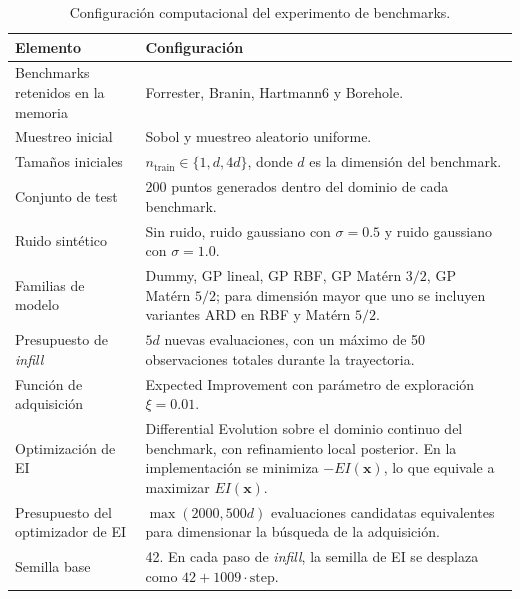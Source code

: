 \begin{table}[htbp]
\centering
\small
\caption[Configuración computacional de benchmarks]{Configuración computacional del experimento de benchmarks.}
\label{tab:app_benchmark_runtime_config}
\renewcommand{\arraystretch}{1.15}
\begin{tabularx}{\textwidth}{@{}p{4.3cm}X@{}}
\toprule
\textbf{Elemento} & \textbf{Configuración} \\
\midrule
Benchmarks retenidos en la memoria &
Forrester, Branin, Hartmann6 y Borehole. \\

Muestreo inicial &
Sobol y muestreo aleatorio uniforme. \\

Tamaños iniciales &
\(n_{\mathrm{train}}\in\{1,d,4d\}\), donde \(d\) es la dimensión del benchmark. \\

Conjunto de test &
200 puntos generados dentro del dominio de cada benchmark. \\

Ruido sintético &
Sin ruido, ruido gaussiano con \(\sigma=0.5\) y ruido gaussiano con \(\sigma=1.0\). \\

Familias de modelo &
Dummy, GP lineal, GP RBF, GP Matérn \(3/2\), GP Matérn \(5/2\); para dimensión mayor que uno se incluyen variantes ARD en RBF y Matérn \(5/2\). \\

Presupuesto de \emph{infill} &
\(5d\) nuevas evaluaciones, con un máximo de 50 observaciones totales durante la trayectoria. \\

Función de adquisición &
Expected Improvement con parámetro de exploración \(\xi=0.01\). \\

Optimización de EI &
Differential Evolution sobre el dominio continuo del benchmark, con refinamiento local posterior. En la implementación se minimiza \(-EI(\bm{x})\), lo que equivale a maximizar \(EI(\bm{x})\). \\

Presupuesto del optimizador de EI &
\(\max(2000,500d)\) evaluaciones candidatas equivalentes para dimensionar la búsqueda de la adquisición. \\

Semilla base &
42. En cada paso de \emph{infill}, la semilla de EI se desplaza como \(42 + 1009\cdot \mathrm{step}\). \\
\bottomrule
\end{tabularx}
\end{table}
\FloatBarrier

